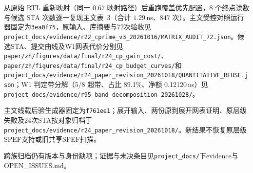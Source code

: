 \documentclass[twocolumn,10pt,fontset=windows]{ctexart}
\begin{document}
从原始 RTL 重新映射（同一 0.67 映射路径）后重跑覆盖优先配置，8 个终点读数与候选 STA 次数逐一复现主文表~3（合计 $1.29$\,ns、$847$ 次）。主文受控对照运行器固定为\texttt{3ea0f75}，原输入、库摘要与72次验收见\nolinkurl{project_docs/evidence/r22_cprime_v3_20261016/MATRIX_AUDIT_72.json}。候选STA、提交曲线及W1网表代价分别见\nolinkurl{paper/zh/figures/data/final/r24_cp_gain_cost/}、\nolinkurl{paper/zh/figures/data/final/r24_cp_budget_curves/}和\nolinkurl{project_docs/evidence/r24_paper_revision_20261018/QUANTITATIVE_REUSE.json}；W1 判定带分解（5/8 超带、占比 89.1\%、净额 0.12120\,ns）见\nolinkurl{project_docs/evidence/r95_band_decomposition_20261028/}。

主文线载后验生成器固定为\texttt{f761ee1}；展开输入、两份原到展开网表证明、原层级失败及24次STA按对象归档于\nolinkurl{project_docs/evidence/r24_paper_revision_20261018/}。新结果不恢复原层级SPEF支持或旧共享SPEF扫描。

跨族归档仍有版本与身份缺项；证据与未决条目见\nolinkurl{project_docs/}下evidence与OPEN\_ISSUES.md。
\end{document}
